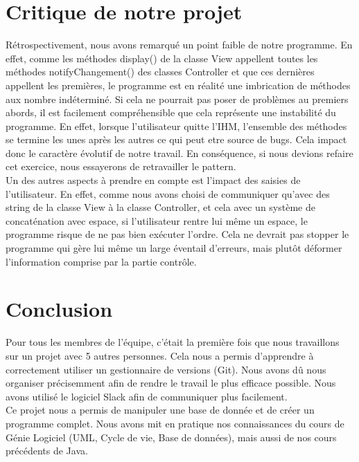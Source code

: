 \documentclass{article}
\begin{document}
\begin{flushleft}
\section{Critique de notre projet}
Rétrospectivement, nous avons remarqué un point faible de notre programme.
En effet, comme les méthodes display() de la classe View appellent toutes
les méthodes notifyChangement() des classes Controller et que ces dernières
appellent les premières, le programme est en réalité une imbrication de
méthodes aux nombre indéterminé. Si cela ne pourrait pas poser de problèmes
au premiers abords, il est facilement compréhensible que cela représente une
instabilité du programme. En effet, lorsque l’utilisateur quitte l’IHM,
l’ensemble des méthodes se termine les unes après les autres ce qui peut
etre source de bugs. Cela impact donc le caractère évolutif de notre travail.
En conséquence, si nous devions refaire cet exercice, nous essayerons de
retravailler le pattern.\\
\vspace{1\baselineskip}
Un des autres aspects à prendre en compte est l’impact des saisies de
l’utilisateur. En effet, comme nous avons choisi de communiquer qu’avec
des string de la classe View à la classe Controller, et cela avec un système
de concaténation avec espace, si l’utilisateur rentre lui même un espace, le
programme risque de ne pas bien exécuter l’ordre. Cela ne devrait pas stopper
le programme qui gère lui même un large éventail d'erreurs, mais plutôt
déformer l’information comprise par la partie contrôle.




\section{Conclusion}
Pour tous les membres de l'équipe, c'était la première fois que nous
travaillons sur un projet avec 5 autres personnes. Cela nous a permis
d'apprendre à correctement utiliser un gestionnaire de versions (Git). Nous
avons dû nous organiser précisemment afin de rendre le travail le plus efficace
possible. Nous avons utilisé le logiciel Slack afin de communiquer plus
facilement. \\
Ce projet nous a permis de manipuler une base de donnée et de créer un
programme complet. Nous avons mit en pratique nos connaissances du cours
de Génie Logiciel (UML, Cycle de vie, Base de données), mais aussi de nos cours
précédents de Java.





\end{flushleft}
\end{document}
